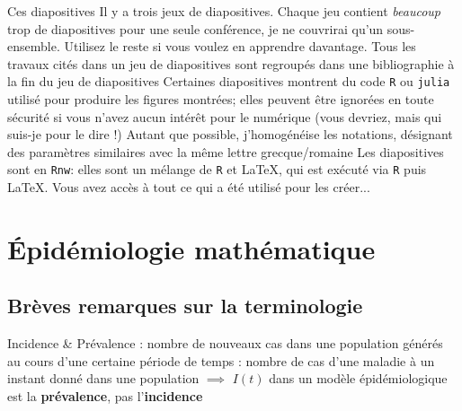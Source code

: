 \documentclass[aspectratio=169]{beamer}\usepackage[]{graphicx}\usepackage[]{xcolor}
\begin{document}
\begin{frame}{Ces diapositives}
\bbullet Il y a trois jeux de diapositives. Chaque jeu contient \emph{beaucoup} trop de diapositives pour une seule conférence, je ne couvrirai qu'un sous-ensemble. Utilisez le reste si vous voulez en apprendre davantage. Tous les travaux cités dans un jeu de diapositives sont regroupés dans une bibliographie à la fin du jeu de diapositives
\vfill
\bbullet Certaines diapositives montrent du code \texttt{R} ou \texttt{julia} utilisé pour produire les figures montrées; elles peuvent être ignorées en toute sécurité si vous n'avez aucun intérêt pour le numérique (vous devriez, mais qui suis-je pour le dire !)
\vfill
\bbullet Autant que possible, j'homogénéise les notations, désignant des paramètres similaires avec la même lettre grecque/romaine
\vfill
\bbullet Les diapositives sont en \texttt{Rnw}: elles sont un mélange de \texttt{R} et \LaTeX, qui est exécuté via \texttt{R} puis \LaTeX. Vous avez accès à tout ce qui a été utilisé pour les créer...
\end{frame}

\section{Épidémiologie mathématique}

\subsection{Brèves remarques sur la terminologie}

\nocite{MilwidSteriuArinoHeffernanEtAl2016}

\begin{frame}{Incidence \& Prévalence}
 : nombre de nouveaux cas dans une population générés au cours d'une certaine période de temps
\vfill
{} : nombre de cas d'une maladie à un instant donné dans une population
\vfill
$\implies$ $I(t)$ dans un modèle épidémiologique est la \textbf{prévalence}, pas l'\textbf{incidence}
\end{frame}
\end{document}
